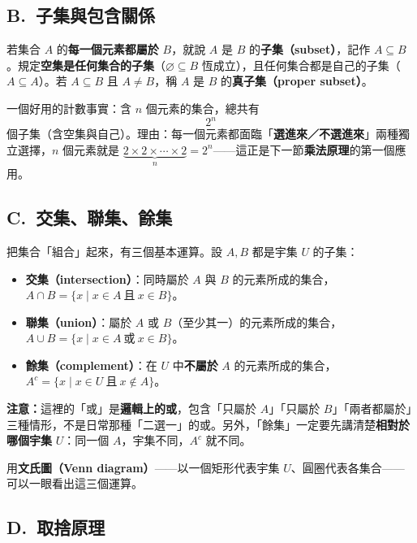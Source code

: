 \documentclass[11pt]{article}
\begin{document}
\subsection*{\sffamily B.\ 子集與包含關係}

若集合 $A$ 的\textbf{每一個元素都屬於} $B$，就說 $A$ 是 $B$ 的\textbf{子集（subset）}，記作 $A\subseteq B$。規定\textbf{空集是任何集合的子集}（$\varnothing\subseteq B$ 恆成立），且任何集合都是自己的子集（$A\subseteq A$）。若 $A\subseteq B$ 且 $A\neq B$，稱 $A$ 是 $B$ 的\textbf{真子集（proper subset）}。

一個好用的計數事實：含 $n$ 個元素的集合，總共有
$$\boxed{\,2^n\,}$$
個子集（含空集與自己）。理由：每一個元素都面臨「\textbf{選進來／不選進來}」兩種獨立選擇，$n$ 個元素就是 $\underbrace{2\times2\times\cdots\times2}_{n}=2^n$——這正是下一節\textbf{乘法原理}的第一個應用。

\subsection*{\sffamily C.\ 交集、聯集、餘集}

把集合「組合」起來，有三個基本運算。設 $A,B$ 都是宇集 $U$ 的子集：

\begin{itemize}\setlength{\itemsep}{2pt}
\item \textbf{交集（intersection）}：同時屬於 $A$ 與 $B$ 的元素所成的集合，$A\cap B=\{x \mid x\in A\ \text{且}\ x\in B\}$。
\item \textbf{聯集（union）}：屬於 $A$ 或 $B$（至少其一）的元素所成的集合，$A\cup B=\{x \mid x\in A\ \text{或}\ x\in B\}$。
\item \textbf{餘集（complement）}：在 $U$ 中\textbf{不屬於} $A$ 的元素所成的集合，$A^{c}=\{x \mid x\in U\ \text{且}\ x\notin A\}$。
\end{itemize}

\textbf{注意：}這裡的「或」是\textbf{邏輯上的或}，包含「只屬於 $A$」「只屬於 $B$」「兩者都屬於」三種情形，不是日常那種「二選一」的或。另外，「餘集」一定要先講清楚\textbf{相對於哪個宇集} $U$：同一個 $A$，宇集不同，$A^c$ 就不同。

用\textbf{文氏圖（Venn diagram）}——以一個矩形代表宇集 $U$、圓圈代表各集合——可以一眼看出這三個運算。


\subsection*{\sffamily D.\ 取捨原理}
\end{document}
